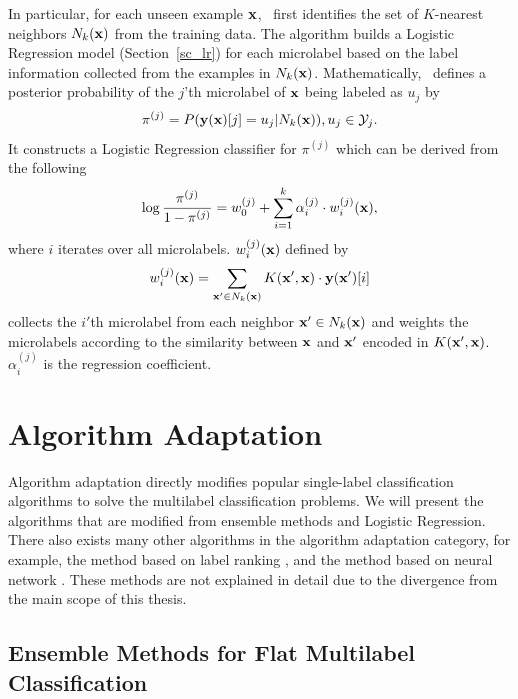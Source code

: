 {In particular, for each unseen example $\mathbf {x}$, \iblr\ first identifies the set of $K$-nearest neighbors $N_k(\mathbf {x})$ from the training data.
The algorithm builds a Logistic Regression model (Section~\ref{sc_lr}) for each microlabel based on the label information collected from the examples in $N_k(\mathbf {x})$.
Mathematically, \iblr\ defines a posterior probability of the $j$'th microlabel of $\mathbf {x}$ being labeled as $u_j$ by
\begin{align*}
	\pi^{(j)} = P( \mathbf {y}(\mathbf {x})[j]=u_j | N_k(\mathbf {x})), u_j\in\mathcal{Y}_j.
\end{align*}
It constructs a Logistic Regression classifier for $\pi^{(j)}$ which can be derived from the following 
\begin{align*}
	\log\frac{\pi^{(j)}}{1-\pi^{(j)}} = w_0^{(j)} + \sum_{i=1}^{k}\alpha_i^{(j)}\cdot w_{i}^{(j)}(\mathbf {x}),
\end{align*}
where $i$ iterates over all microlabels.
$w_i^{(j)}(\mathbf {x})$ defined by 
\begin{align*}
	w_i^{(j)}(\mathbf {x}) = \sum_{\mathbf {x}'\in N_k(\mathbf {x})}K(\mathbf {x}',\mathbf {x})\cdot \mathbf {y}(\mathbf {x}')[i]
\end{align*}
collects the $i'$th microlabel from each neighbor $\mathbf {x}'\in N_k(\mathbf {x})$ and weights the microlabels according to the similarity between $\mathbf {x}$ and $\mathbf {x}'$ encoded in $K(\mathbf {x}',\mathbf {x})$.
$\alpha_i^{(j)}$ is the regression coefficient.



%
%
\section{Algorithm Adaptation}

Algorithm adaptation directly modifies popular single-label classification algorithms to solve the multilabel classification problems.
We will present the algorithms that are modified from ensemble methods and Logistic Regression.
There also exists many other algorithms in the algorithm adaptation category, for example, the method based on label ranking \citep{Crammer03afamily}, and the method based on neural network \citep{Zhang06multilabel}.
These methods are not explained in detail due to the divergence from the main scope of this thesis.



%
%
\subsection{Ensemble Methods for Flat Multilabel Classification} \label{sc_emfmlc}

}
